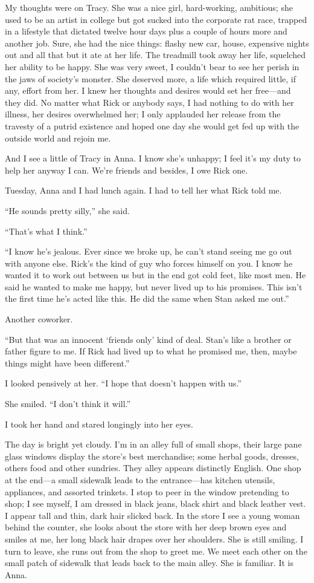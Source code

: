 My thoughts were on Tracy. She was a nice girl, hard-working, ambitious;
she used to be an artist in college but got sucked into the corporate
rat race, trapped in a lifestyle that dictated twelve hour days plus a
couple of hours more and another job. Sure, she had the nice things:
flashy new car, house, expensive nights out and all that but it ate at
her life. The treadmill took away her life, squelched her ability to be
happy. She was very sweet, I couldn't bear to see her perish in the jaws
of society's monster. She deserved more, a life which required little,
if any, effort from her. I knew her thoughts and desires would set her
free---and they did. No matter what Rick or anybody says, I had nothing
to do with her illness, her desires overwhelmed her; I only applauded
her release from the travesty of a putrid existence and hoped one day
she would get fed up with the outside world and rejoin me.

And I see a little of Tracy in Anna. I know she's unhappy; I feel it's
my duty to help her anyway I can. We're friends and besides, I owe Rick
one.

Tuesday, Anna and I had lunch again. I had to tell her what Rick told
me.

``He sounds pretty silly,'' she said.

``That's what I think.''

``I know he's jealous. Ever since we broke up, he can't stand seeing me
go out with anyone else. Rick's the kind of guy who forces himself on
you. I know he wanted it to work out between us but in the end got cold
feet, like most men. He said he wanted to make me happy, but never lived
up to his promises. This isn't the first time he's acted like this. He
did the same when Stan asked me out.''

Another coworker.

``But that was an innocent `friends only' kind of deal. Stan's like a
brother or father figure to me. If Rick had lived up to what he promised
me, then, maybe things might have been different.''

I looked pensively at her. ``I hope that doesn't happen with us.''

She smiled. ``I don't think it will.''

I took her hand and stared longingly into her eyes.

The day is bright yet cloudy. I'm in an alley full of small shops, their
large pane glass windows display the store's best merchandise; some
herbal goods, dresses, others food and other sundries. They alley
appears distinctly English. One shop at the end---a small sidewalk leads
to the entrance---has kitchen utensils, appliances, and assorted
trinkets. I stop to peer in the window pretending to shop; I see myself,
I am dressed in black jeans, black shirt and black leather vest. I
appear tall and thin, dark hair slicked back. In the store I see a young
woman behind the counter, she looks about the store with her deep brown
eyes and smiles at me, her long black hair drapes over her shoulders.
She is still smiling. I turn to leave, she runs out from the shop to
greet me. We meet each other on the small patch of sidewalk that leads
back to the main alley. She is familiar. It is Anna.

